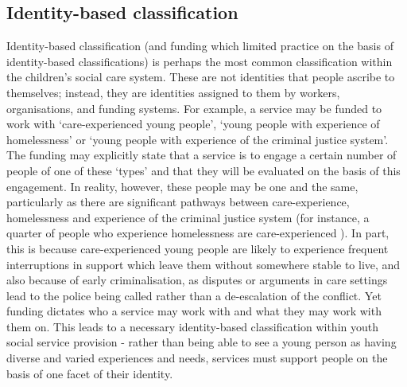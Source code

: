 \subsection{Identity-based classification}
\label{subsec:6-6-1-identity}
Identity-based classification (and funding which limited practice on the basis of identity-based classifications) is perhaps the most common classification within the children's social care system. These are not identities that people ascribe to themselves; instead, they are identities assigned to them by workers, organisations, and funding systems. For example, a service may be funded to work with `care-experienced young people', `young people with experience of homelessness' or `young people with experience of the criminal justice system'. The funding may explicitly state that a service is to engage a certain number of people of one of these `types' and that they will be evaluated on the basis of this engagement. In reality, however, these people may be one and the same, particularly as there are significant pathways between care-experience, homelessness and experience of the criminal justice system (for instance, a quarter of people who experience homelessness are care-experienced \citep{mackie_nations_2014}). In part, this is because care-experienced young people are likely to experience frequent interruptions in support which leave them without somewhere stable to live, and also because of early criminalisation, as disputes or arguments in care settings lead to the police being called rather than a de-escalation of the conflict. Yet funding dictates who a service may work with and what they may work with them on. This leads to a necessary identity-based classification within youth social service provision - rather than being able to see a young person as having diverse and varied experiences and needs, services must support people on the basis of one facet of their identity.

